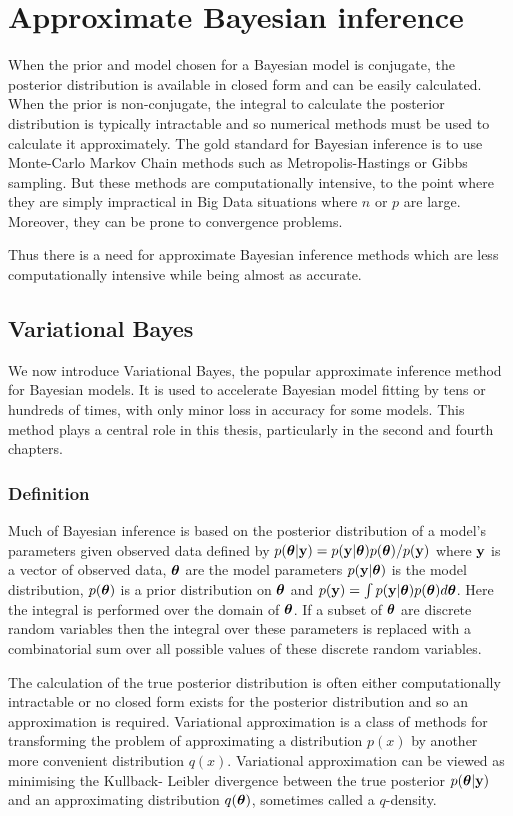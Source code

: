 \section{Approximate Bayesian inference}
When the prior and model chosen for a Bayesian model is conjugate, the posterior distribution is available in
closed form and can be easily calculated.
When the prior is non-conjugate, the integral to calculate the posterior distribution is typically intractable
and so numerical methods must be used to calculate it approximately.
The gold standard for Bayesian inference is to use Monte-Carlo Markov Chain methods such as Metropolis-Hastings
or Gibbs sampling. But these methods are computationally intensive, to the point where they are simply
impractical in Big Data situations where $n$ or $p$ are large. Moreover, they can be prone to convergence 
problems.

Thus there is a need for approximate Bayesian inference methods which are less computationally intensive while
being almost as accurate.

 
\subsection{Variational Bayes}
\label{sec:vb}
We now introduce Variational Bayes, the popular approximate inference method for Bayesian models. It is used
to accelerate Bayesian model fitting by tens or hundreds of times, with only minor loss in accuracy for some
models. This method plays a central role in this thesis, particularly in the second and fourth chapters.

\subsubsection{Definition}

Much of Bayesian inference is based on the posterior distribution of a model's parameters given observed data 
defined by $p({\boldsymbol \theta}|{\bf y}) = p({\bf y}|{\boldsymbol \theta})p({\boldsymbol \theta})/p({\bf y})$ where ${\bf y}$ is a vector of observed data,
${\boldsymbol \theta}$ are the model parameters $p({\bf y}|{\boldsymbol \theta})$ is the model distribution, $p({\boldsymbol \theta})$ is a prior 
distribution on ${\boldsymbol \theta}$ and $p({\bf y})=\int p({\bf y}|{\boldsymbol \theta})p({\boldsymbol \theta})d{\boldsymbol \theta}$. Here the integral is performed
over the domain of ${\boldsymbol \theta}$. If a subset of ${\boldsymbol \theta}$ are discrete random variables then the integral over
these parameters is replaced with a combinatorial sum over all possible values of these discrete random 
variables.

The calculation of the true posterior distribution is often either computationally intractable or no closed form
exists for the posterior distribution and so an approximation is required. Variational approximation is a
class of methods for transforming the problem of approximating a distribution $p(x)$ by another more
convenient distribution $q(x)$. Variational approximation can be viewed as minimising the Kullback- Leibler
divergence between the true posterior $p({\boldsymbol \theta}|{\bf y})$ and an approximating distribution $q({\boldsymbol \theta})$,
sometimes called a $q$-density. 

